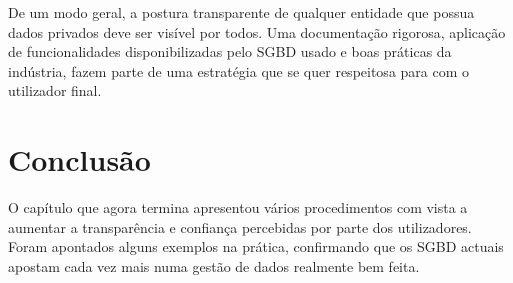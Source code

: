 De um modo geral, a postura transparente de qualquer entidade que possua dados privados deve ser visível por todos. Uma documentação rigorosa, aplicação de funcionalidades disponibilizadas pelo \ac{SGBD} usado e boas práticas da indústria, fazem parte de uma estratégia que se quer respeitosa para com o utilizador final.

\section{Conclusão}
\label{chap3:conclusao}
O capítulo que agora termina apresentou vários procedimentos com vista a aumentar a transparência e confiança percebidas por parte dos utilizadores. Foram apontados alguns exemplos na prática, confirmando que os \ac{SGBD} actuais apostam cada vez mais numa gestão de dados realmente bem feita.